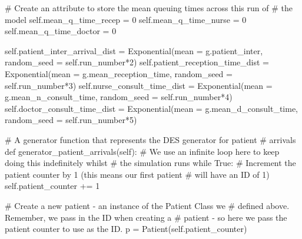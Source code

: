 \documentclass[
  letterpaper,
  DIV=11,
  numbers=noendperiod]{scrreprt}
\newenvironment{Shaded}{\begin{snugshade}}{\end{snugshade}}
\newcommand{\CommentTok}[1]{\textcolor[rgb]{0.37,0.37,0.37}{#1}}
\newcommand{\ControlFlowTok}[1]{\textcolor[rgb]{0.00,0.23,0.31}{#1}}
\newcommand{\DecValTok}[1]{\textcolor[rgb]{0.68,0.00,0.00}{#1}}
\newcommand{\KeywordTok}[1]{\textcolor[rgb]{0.00,0.23,0.31}{#1}}
\newcommand{\NormalTok}[1]{\textcolor[rgb]{0.00,0.23,0.31}{#1}}
\newcommand{\OperatorTok}[1]{\textcolor[rgb]{0.37,0.37,0.37}{#1}}
\newcommand{\VariableTok}[1]{\textcolor[rgb]{0.07,0.07,0.07}{#1}}
\begin{document}
\begin{tcolorbox}
\begin{Shaded}
\begin{Highlighting}[]
        \CommentTok{\# Create an attribute to store the mean queuing times across this run of}
        \CommentTok{\# the model}
        \VariableTok{self}\NormalTok{.mean\_q\_time\_recep }\OperatorTok{=} \DecValTok{0}
        \VariableTok{self}\NormalTok{.mean\_q\_time\_nurse }\OperatorTok{=} \DecValTok{0}
        \VariableTok{self}\NormalTok{.mean\_q\_time\_doctor }\OperatorTok{=} \DecValTok{0}

        \VariableTok{self}\NormalTok{.patient\_inter\_arrival\_dist }\OperatorTok{=}\NormalTok{ Exponential(mean }\OperatorTok{=}\NormalTok{ g.patient\_inter, random\_seed }\OperatorTok{=} \VariableTok{self}\NormalTok{.run\_number}\OperatorTok{*}\DecValTok{2}\NormalTok{)}
        \VariableTok{self}\NormalTok{.patient\_reception\_time\_dist }\OperatorTok{=}\NormalTok{ Exponential(mean }\OperatorTok{=}\NormalTok{ g.mean\_reception\_time, random\_seed }\OperatorTok{=} \VariableTok{self}\NormalTok{.run\_number}\OperatorTok{*}\DecValTok{3}\NormalTok{)}
        \VariableTok{self}\NormalTok{.nurse\_consult\_time\_dist }\OperatorTok{=}\NormalTok{ Exponential(mean }\OperatorTok{=}\NormalTok{ g.mean\_n\_consult\_time, random\_seed }\OperatorTok{=} \VariableTok{self}\NormalTok{.run\_number}\OperatorTok{*}\DecValTok{4}\NormalTok{)}
        \VariableTok{self}\NormalTok{.doctor\_consult\_time\_dist }\OperatorTok{=}\NormalTok{ Exponential(mean }\OperatorTok{=}\NormalTok{ g.mean\_d\_consult\_time, random\_seed }\OperatorTok{=} \VariableTok{self}\NormalTok{.run\_number}\OperatorTok{*}\DecValTok{5}\NormalTok{)}

    \CommentTok{\# A generator function that represents the DES generator for patient}
    \CommentTok{\# arrivals}
    \KeywordTok{def}\NormalTok{ generator\_patient\_arrivals(}\VariableTok{self}\NormalTok{):}
        \CommentTok{\# We use an infinite loop here to keep doing this indefinitely whilst}
        \CommentTok{\# the simulation runs}
        \ControlFlowTok{while} \VariableTok{True}\NormalTok{:}
            \CommentTok{\# Increment the patient counter by 1 (this means our first patient}
            \CommentTok{\# will have an ID of 1)}
            \VariableTok{self}\NormalTok{.patient\_counter }\OperatorTok{+=} \DecValTok{1}

            \CommentTok{\# Create a new patient {-} an instance of the Patient Class we}
            \CommentTok{\# defined above.  Remember, we pass in the ID when creating a}
            \CommentTok{\# patient {-} so here we pass the patient counter to use as the ID.}
\NormalTok{            p }\OperatorTok{=}\NormalTok{ Patient(}\VariableTok{self}\NormalTok{.patient\_counter)}


\end{Highlighting}
\end{Shaded}
\end{tcolorbox}
\end{document}
